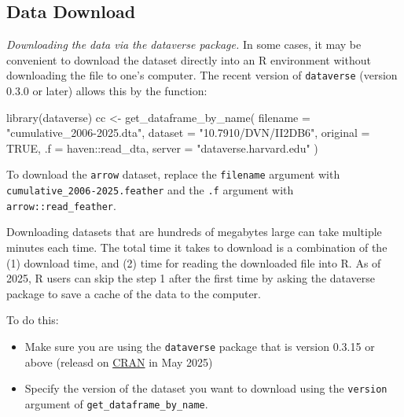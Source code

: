 \documentclass[10pt,article,oneside]{memoir}
\newenvironment{Shaded}{\begin{snugshade}}{\end{snugshade}}
\newcommand{\AttributeTok}[1]{\textcolor[rgb]{0.40,0.45,0.13}{#1}}
\newcommand{\ConstantTok}[1]{\textcolor[rgb]{0.56,0.35,0.01}{#1}}
\newcommand{\FunctionTok}[1]{\textcolor[rgb]{0.28,0.35,0.67}{#1}}
\newcommand{\NormalTok}[1]{\textcolor[rgb]{0.00,0.23,0.31}{#1}}
\newcommand{\OtherTok}[1]{\textcolor[rgb]{0.00,0.23,0.31}{#1}}
\newcommand{\SpecialCharTok}[1]{\textcolor[rgb]{0.37,0.37,0.37}{#1}}
\newcommand{\StringTok}[1]{\textcolor[rgb]{0.13,0.47,0.30}{#1}}
\begin{document}
\subsection{Data Download}\label{data-download}

\noindent \emph{Downloading the data via the dataverse package.} In some
cases, it may be convenient to download the dataset directly into an R
environment without downloading the file to one's computer. The recent
version of \texttt{dataverse} (version 0.3.0 or later) allows this by
the function:

\begin{Shaded}
\begin{Highlighting}[]
\FunctionTok{library}\NormalTok{(dataverse)}
\NormalTok{cc }\OtherTok{\textless{}{-}} \FunctionTok{get\_dataframe\_by\_name}\NormalTok{(}
  \AttributeTok{filename =} \StringTok{"cumulative\_2006{-}2025.dta"}\NormalTok{,}
  \AttributeTok{dataset =} \StringTok{"10.7910/DVN/II2DB6"}\NormalTok{,}
  \AttributeTok{original =} \ConstantTok{TRUE}\NormalTok{,}
  \AttributeTok{.f =}\NormalTok{ haven}\SpecialCharTok{::}\NormalTok{read\_dta,}
  \AttributeTok{server =} \StringTok{"dataverse.harvard.edu"}
\NormalTok{)}
\end{Highlighting}
\end{Shaded}

To download the \texttt{arrow} dataset, replace the \texttt{filename}
argument with \texttt{cumulative\_2006-2025.feather} and the \texttt{.f}
argument with \texttt{arrow::read\_feather}.

Downloading datasets that are hundreds of megabytes large can take
multiple minutes each time. The total time it takes to download is a
combination of the (1) download time, and (2) time for reading the
downloaded file into R. As of 2025, R users can skip the step 1 after
the first time by asking the dataverse package to save a cache of the
data to the computer.

To do this:

\begin{itemize}
\tightlist
\item
  Make sure you are using the \texttt{dataverse} package that is version
  0.3.15 or above (releasd on
  \href{https://cran.r-project.org/web/packages/dataverse/index.html}{CRAN}
  in May 2025)
\item
  Specify the version of the dataset you want to download using the
  \texttt{version} argument of \texttt{get\_dataframe\_by\_name}.
\end{itemize}
\end{document}
